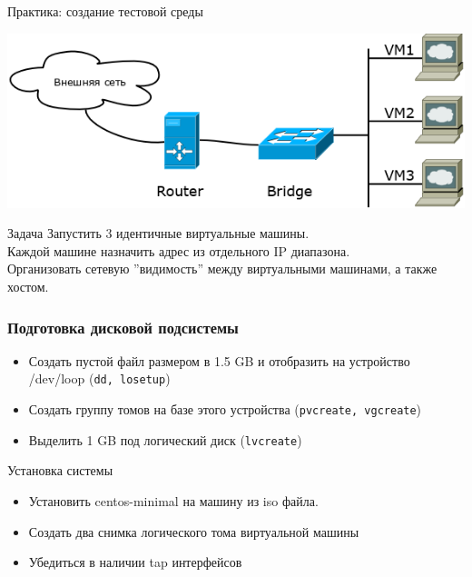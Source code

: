 \begin{frame}{Практика: создание тестовой среды}

	\center\includegraphics[height=0.4\textheight]{../../slides/networking/net-practice.png}


	\begin{block}{Задача}
		Запустить 3 идентичные виртуальные машины.\\
		Каждой машине назначить адрес из отдельного IP диапазона.\\
		Организовать сетевую ''видимость'' между виртуальными машинами, а также хостом.		
	\end{block}

\end{frame}



\begin{frame}
	\frametitle{Подготовка дисковой подсистемы}
			\begin{itemize}
				\item Создать пустой файл размером в 1.5 GB и отобразить на устройство
					/dev/loop ({\tt dd, losetup})
				\item Создать группу томов на базе этого устройства ({\tt pvcreate, vgcreate})
				\item Выделить 1 GB под логический диск ({\tt lvcreate})
			\end{itemize}
\end{frame}

\begin{frame}[fragile]{Установка системы}
        \begin{itemize}
			\item Установить centos-minimal на  машину из iso файла.
            \item Создать два снимка логического тома виртуальной машины
			\item Убедиться в наличии tap интерфейсов
		\end{itemize}

\end{frame}

